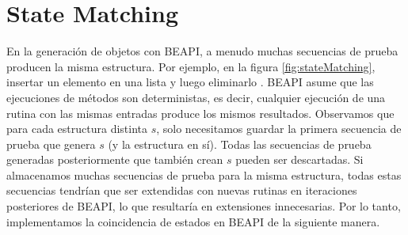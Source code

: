 

\section{State Matching}
\label{sec:stateMatching}

En la generación de objetos con \textsf{BEAPI}, a menudo muchas secuencias de prueba producen la misma estructura. Por ejemplo, en la figura \ref{fig:stateMatching}, insertar un elemento en una lista y luego eliminarlo . \textsf{BEAPI} asume que las ejecuciones de métodos son deterministas, es decir, cualquier ejecución de una rutina con las mismas entradas produce los mismos resultados. Observamos que para cada estructura distinta $s$, solo necesitamos guardar la primera secuencia de prueba que genera $s$ (y la estructura en sí). Todas las secuencias de prueba generadas posteriormente que también crean $s$ pueden ser descartadas. Si almacenamos muchas secuencias de prueba para la misma estructura, todas estas secuencias tendrían que ser extendidas con nuevas rutinas en iteraciones posteriores de \textsf{BEAPI}, lo que resultaría en extensiones innecesarias. Por lo tanto, implementamos la coincidencia de estados en \textsf{BEAPI} de la siguiente manera.

